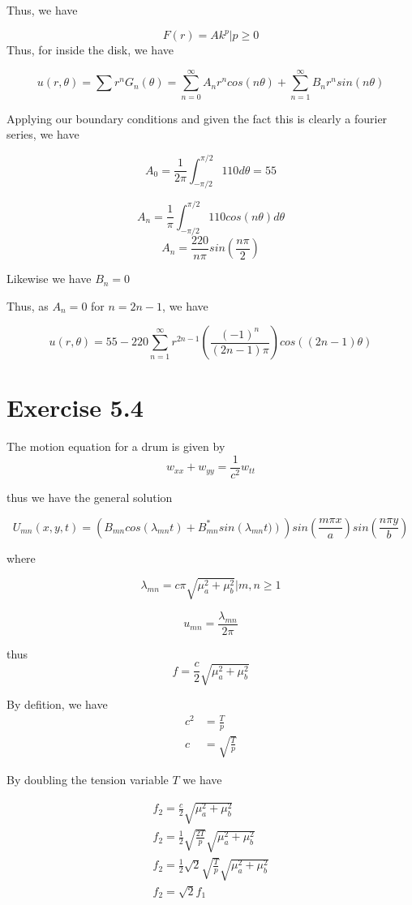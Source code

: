 \documentclass{article}
\begin{document}
Thus, we have

$$F(r) = A k^p\Bigr| p \geq 0$$
Thus, for inside the disk, we have

$$u(r,\theta) = \sum r^n G_n(\theta) = \sum_{n=0}^{\infty} A_n r^n cos(n \theta) + \sum_{n=1}^{\infty} B_n r^n sin (n\theta)$$

Applying our boundary conditions and given the fact this is clearly a fourier series, we have

$$A_0 = \frac{1}{2\pi} \int_{-\pi/2}^{\pi/2} 110 d\theta = 55$$

$$A_n= \frac{1}{\pi} \int_{-\pi/2}^{\pi/2} 110 cos(n\theta) d\theta$$
$$A_n = \frac{220}{n \pi} sin\left(\frac{n\pi}{2}\right)$$

Likewise we have $B_n = 0$

Thus, as $A_n=0$ for $n=2n-1$, we have

$$u(r,\theta) = 55 -220 \sum_{n=1}^{\infty} r^{2n-1} \left(\frac{(-1)^n}{(2n-1)\pi}\right) cos((2n-1)\theta)$$



\section*{Exercise 5.4}
The motion equation for a drum is given by
$$
w_{xx}+w_{yy}=\frac{1}{c^2}w_{tt}
$$

thus we have the general solution

$$
U_{mn}(x,y,t) = \left(B_{mn}cos(\lambda_{mn}t)+B^{*}_{mn}sin\left(\lambda_{mn}t)\right)\right)sin\left(\frac{m \pi x}{a}\right)sin\left(\frac{n \pi y}{b}\right)
$$

where

$$
\lambda_{mn} = c\pi \sqrt{\mu_a^2 + \mu_b^2}\Bigr| m,n \geq 1
$$

$$
u_{mn} = \frac{\lambda_{mn}}{2\pi }
$$

thus
$$
f = \frac{c}{2} \sqrt{\mu_a^2 + \mu_b^2}
$$

By defition, we have 
\begin{align*}
c^2 &= \frac{T}{p}\\
c &= \sqrt{\frac{T}{p}}
\end{align*}

By doubling the tension variable $T$ we have

\begin{align*}
f_2 = \frac{c}{2} \sqrt{\mu_a^2 + \mu_b^2} \\
f_2 = \frac{1}{2} \sqrt{\frac{2T}{p}}\sqrt{\mu_a^2 + \mu_b^2} \\
f_2 = \frac{1}{2} \sqrt{2} \sqrt{\frac{T}{p}}\sqrt{\mu_a^2 + \mu_b^2} \\
f_2 = \sqrt{2} f_1
\end{align*}
\end{document}

